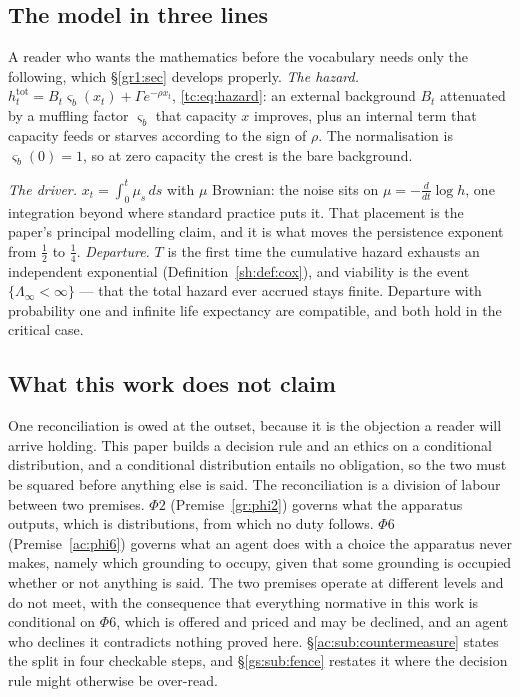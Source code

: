\documentclass[11pt]{article}
\numberwithin{equation}{section}
\theoremstyle{plain}
\theoremstyle{definition}
\theoremstyle{remark}
\begin{document}
\subsection{The model in three lines}\label{intro:sub:model}

A reader who wants the mathematics before the vocabulary needs only the
following, which \S\ref{gr1:sec} develops properly. \emph{The hazard.} $h^{\mathrm{tot}}_t=B_t\varsigma_b(x_t)+\Gamma
e^{-\rho x_t}$, \eqref{tc:eq:hazard}: an external background $B_t$
attenuated by a muffling factor $\varsigma_b$ that capacity $x$ improves,
plus an internal term that capacity feeds or starves according to the
sign of $\rho$. The normalisation is $\varsigma_b(0)=1$, so at zero
capacity the crest is the bare background.

\emph{The driver.} $x_t=\int_0^t\mu_s\,ds$ with $\mu$ Brownian: the noise
sits on $\mu=-\tfrac{d}{dt}\log h$, one integration beyond where standard
practice puts it. That placement is the paper's principal modelling
claim, and it is what moves the persistence exponent from $\tfrac12$ to
$\tfrac14$. \emph{Departure.} $T$ is the first time the cumulative hazard exhausts an
independent exponential (Definition~\ref{sh:def:cox}), and viability is
the event $\{\Lambda_\infty<\infty\}$ --- that the total hazard ever
accrued stays finite. Departure with probability one and infinite life
expectancy are compatible, and both hold in the critical case.

\subsection{What this work does not claim}\label{intro:sub:notclaimed}

One reconciliation is owed at the outset, because it is the objection
a reader will arrive holding. This paper builds a decision rule and an
ethics on a conditional distribution, and a conditional distribution
entails no obligation, so the two must be squared before anything else
is said. The reconciliation is a division of labour between two
premises. $\Phi2$ (Premise~\ref{gr:phi2}) governs what the apparatus
outputs, which is distributions, from which no duty follows. $\Phi6$
(Premise~\ref{ac:phi6}) governs what an agent does with a choice the
apparatus never makes, namely which grounding to occupy, given that
some grounding is occupied whether or not anything is said. The two
premises operate at different levels and do not meet, with the
consequence that everything normative in this work is conditional on
$\Phi6$, which is offered and priced and may be declined, and an
agent who declines it contradicts nothing proved here.
\S\ref{ac:sub:countermeasure} states the split in four checkable
steps, and \S\ref{gs:sub:fence} restates it where the decision rule
might otherwise be over-read.
\end{document}
